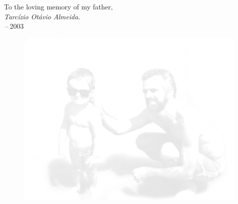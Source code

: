 
\begin{dedication} 

\begin{center}
    To the loving memory of my father, \\ \smallskip
    \emph{Tarc\'izio Ot\'avio Almeida}. \\ \,--\,2003
\end{center}

\begin{figure}[!htb]
    \centering
    {\includegraphics[width=.66\linewidth]{gfx/dad.png}}
\end{figure}

\end{dedication}

